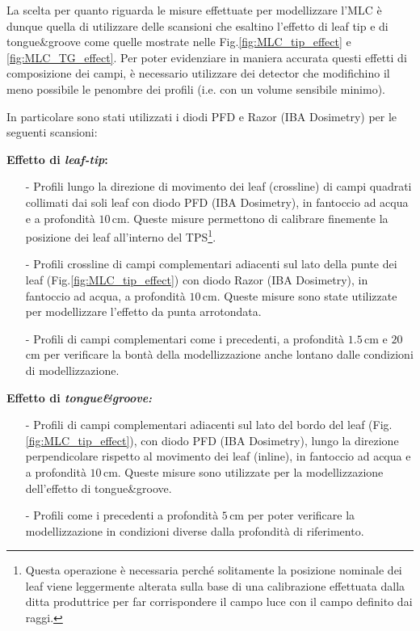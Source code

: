 La scelta per quanto riguarda le misure effettuate per modellizzare l'MLC è dunque quella di utilizzare delle scansioni che esaltino l'effetto di leaf tip e di tongue\&{}groove come quelle mostrate nelle Fig.\ref{fig:MLC_tip_effect} e \ref{fig:MLC_TG_effect}. Per poter evidenziare in maniera accurata questi effetti di composizione dei campi, è necessario utilizzare dei detector che modifichino il meno possibile le penombre dei profili (i.e. con un volume sensibile minimo).

In particolare sono stati utilizzati i diodi PFD e Razor (IBA Dosimetry) per le seguenti scansioni:\vspace*{.2cm}

\textbf{Effetto di \textit{leaf-tip}:}
\begin{itemize}
\item[-] Profili lungo la direzione di movimento dei leaf (crossline) di campi quadrati collimati dai soli leaf con diodo PFD (IBA Dosimetry), in fantoccio ad acqua e a profondità $10\,$cm. Queste misure permettono di calibrare finemente la posizione dei leaf all'interno del TPS\footnote{Questa operazione è necessaria perché solitamente la posizione nominale dei leaf viene leggermente alterata sulla base di una calibrazione effettuata dalla ditta produttrice per far corrispondere il campo luce con il campo definito dai raggi.}.
\item[-] Profili crossline di campi complementari adiacenti sul lato della punte dei leaf (Fig.\ref{fig:MLC_tip_effect}) con diodo Razor (IBA Dosimetry), in fantoccio ad acqua, a profondità $10\,$cm. Queste misure sono state utilizzate per modellizzare l'effetto da punta arrotondata.
\item[-] Profili di campi complementari come i precedenti, a profondità $1.5\,$cm e $20\,$cm per verificare la bontà della modellizzazione anche lontano dalle condizioni di modellizzazione.
\end{itemize}

\textbf{Effetto di \textit{tongue\&{}groove:}}
\begin{itemize}
\item[-] Profili di campi complementari adiacenti sul lato del bordo del leaf (Fig.\ref{fig:MLC_tip_effect}), con diodo PFD (IBA Dosimetry), lungo la direzione perpendicolare rispetto al movimento dei leaf (inline), in fantoccio ad acqua e a profondità $10\,$cm. Queste misure sono utilizzate per la modellizzazione dell'effetto di tongue\&{}groove.
\item[-] Profili come i precedenti a profondità $5\,$cm per poter verificare la modellizzazione in condizioni diverse dalla profondità di riferimento.
\end{itemize}





